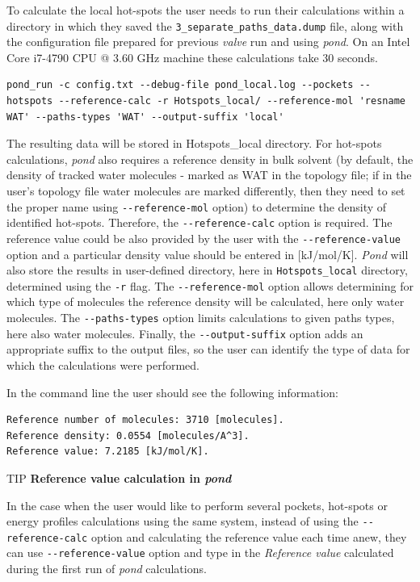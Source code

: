 \documentclass[9pt,tutorial]{livecoms}
\begin{document}
To calculate the local hot-spots the user needs to run their calculations within a directory in which they saved the \texttt{3\_separate\_paths\_data.dump} file, along with the configuration file prepared for previous \emph{valve} run and using \emph{pond}. On an Intel Core i7-4790 CPU @ 3.60 GHz machine these calculations take 30 seconds.
\begin{lstlisting}
pond_run -c config.txt --debug-file pond_local.log --pockets --hotspots --reference-calc -r Hotspots_local/ --reference-mol 'resname WAT' --paths-types 'WAT' --output-suffix 'local'
\end{lstlisting}
The resulting data will be stored in Hotspots\_local directory. For hot-spots calculations, \emph{pond} also requires a reference density in bulk solvent (by default, the density of tracked water molecules - marked as WAT in the topology file; if in the user's topology file water molecules are marked differently, then they need to set the proper name using \texttt{-{}-reference-mol} option) to determine the density of identified hot-spots. Therefore, the \texttt{-{}-reference-calc} option is required. The reference value could be also provided by the user with the \texttt{-{}-reference-value} option and a particular density value should be entered in [kJ/mol/K].
\emph{Pond} will also store the results in user-defined directory, here in \texttt{Hotspots\_local} directory, determined using the \texttt{-r} flag. The \texttt{-{}-reference-mol} option allows determining for which type of molecules the reference density will be calculated, here only water molecules. The \texttt{-{}-paths-types} option limits calculations to given paths types, here also water molecules. Finally, the \texttt{-{}-output-suffix} option adds an appropriate suffix to the output files, so the user can identify the type of data for which the calculations were performed. 

In the command line the user should see the following information:
\begin{lstlisting}[columns=fullflexible]
Reference number of molecules: 3710 [molecules].
Reference density: 0.0554 [molecules/A^3].
Reference value: 7.2185 [kJ/mol/K].
\end{lstlisting}

\begin{Checklists}
\begin{checklist}{TIP}
\textbf{Reference value calculation in \textit{pond}}

In the case when the user would like to perform several pockets, hot-spots or energy profiles calculations using the same system, instead of using the \texttt{-{}-reference-calc} option and calculating the reference value each time anew, they can use \texttt{-{}-reference-value} option and type in the \textit{Reference value} calculated during the first run of \textit{pond} calculations.
\end{checklist}
\end{Checklists}
\end{document}
